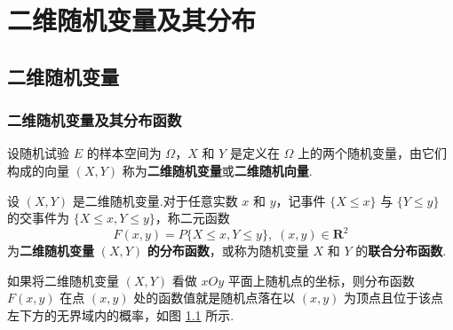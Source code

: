 
\chapter{二维随机变量及其分布}
\thispagestyle{plain}

\section{二维随机变量}

\subsection{二维随机变量及其分布函数}

\begin{definition}
    设随机试验 $E$ 的样本空间为 $\varOmega$，$X$ 和 $Y$ 是定义在 $\varOmega$ 上的两个随机变量，由它们构成的向量 $(X,Y)$ 称为\textbf{二维随机变量}或\textbf{二维随机向量}.
\end{definition}

\begin{definition}
    设 $(X,Y)$ 是二维随机变量.对于任意实数 $x$ 和 $y$，记事件 $\{X \leqslant x\}$ 与 $\{Y \leqslant y\}$ 的交事件为 $\{X \leqslant x, Y \leqslant y\}$，称二元函数
    $$
    F(x, y) = P\{X \leqslant x, Y \leqslant y\}, \; (x,y) \in \mathbf{R}^2
    $$
    为\textbf{二维随机变量} $(X,Y)$ \textbf{的分布函数}，或称为随机变量 $X$ 和 $Y$ 的\textbf{联合分布函数}.
\end{definition}

如果将二维随机变量 $(X,Y)$ 看做 $xOy$ 平面上随机点的坐标，则分布函数 $F(x,y)$ 在点 $(x,y)$ 处的函数值就是随机点落在以 $(x,y)$ 为顶点且位于该点左下方的无界域内的概率，如图 \ref{fig:F(x,y)} 所示.

\begin{figure}[htbp]
    \centering


    \caption{}
    \label{fig:F(x,y)}
\end{figure}


